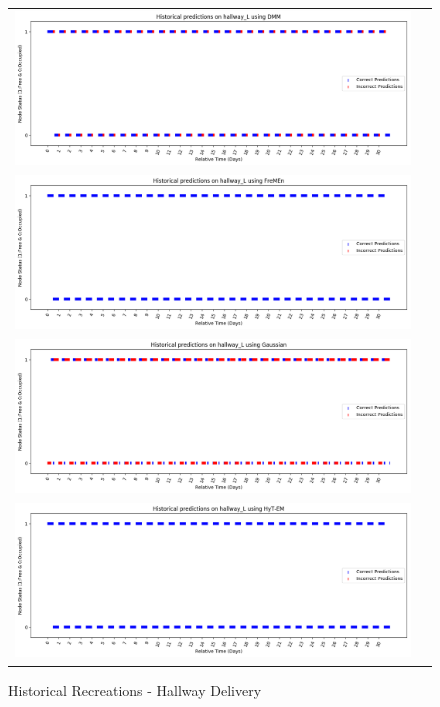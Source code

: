 \begin{figure}[!Hp]
  \begin{tabular}{cc}
    {\includegraphics[width = 6in]{images/results/Historical_hallway_L_DMM.png}} \\
    {\includegraphics[width = 6in]{images/results/Historical_hallway_L_FreMEn.png}} \\
    {\includegraphics[width = 6in]{images/results/Historical_hallway_L_Gaussian.png}} \\
    {\includegraphics[width = 6in]{images/results/Historical_hallway_L_HyT-EM.png}} \\
  \end{tabular}
  \caption{Historical Recreations - Hallway Delivery}
\end{figure}

